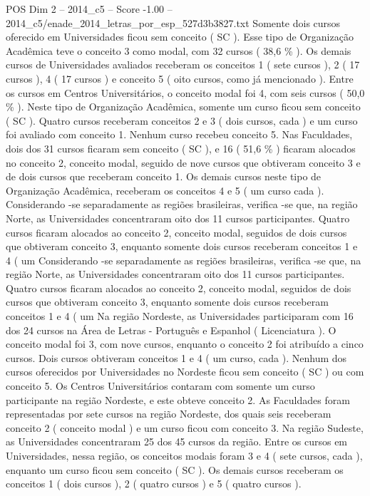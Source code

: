 \begin{textsample}{POS Dim 2 – 2014\_c5 – Score -1.00 – 2014\_c5/enade\_2014\_letras\_por\_esp\_527d3b3827.txt}
Somente dois cursos oferecido em Universidades ficou sem conceito ( SC ).
Esse tipo de Organização Acadêmica teve o conceito 3 como modal, com 32 cursos ( 38,6 \% ).
Os demais cursos de Universidades avaliados receberam os conceitos 1 ( sete cursos ), 2 ( 17 cursos ), 4 ( 17 cursos ) e conceito 5 ( oito cursos, como já mencionado ).
Entre os cursos em Centros Universitários, o conceito modal foi 4, com seis cursos ( 50,0 \% ).
Neste tipo de Organização Acadêmica, somente um curso ficou sem conceito ( SC ).
Quatro cursos receberam conceitos 2 e 3 ( dois cursos, cada ) e um curso foi avaliado com conceito 1.
Nenhum curso recebeu conceito 5.
Nas Faculdades, dois dos 31 cursos ficaram sem conceito ( SC ), e 16 ( 51,6 \% ) ficaram alocados no conceito 2, conceito modal, seguido de nove cursos que obtiveram conceito 3 e de dois cursos que receberam conceito 1.
Os demais cursos neste tipo de Organização Acadêmica, receberam os conceitos 4 e 5 ( um curso cada ).
Considerando -se separadamente as regiões brasileiras, verifica -se que, na região Norte, as Universidades concentraram oito dos 11 cursos participantes.
Quatro cursos ficaram alocados ao conceito 2, conceito modal, seguidos de dois cursos que obtiveram conceito 3, enquanto somente dois cursos receberam conceitos 1 e 4 ( um Considerando -se separadamente as regiões brasileiras, verifica -se que, na região Norte, as Universidades concentraram oito dos 11 cursos participantes.
Quatro cursos ficaram alocados ao conceito 2, conceito modal, seguidos de dois cursos que obtiveram conceito 3, enquanto somente dois cursos receberam conceitos 1 e 4 ( um Na região Nordeste, as Universidades participaram com 16 dos 24 cursos na Área de Letras - Português e Espanhol ( Licenciatura ).
O conceito modal foi 3, com nove cursos, enquanto o conceito 2 foi atribuído a cinco cursos.
Dois cursos obtiveram conceitos 1 e 4 ( um curso, cada ).
Nenhum dos cursos oferecidos por Universidades no Nordeste ficou sem conceito ( SC ) ou com conceito 5.
Os Centros Universitários contaram com somente um curso participante na região Nordeste, e este obteve conceito 2.
As Faculdades foram representadas por sete cursos na região Nordeste, dos quais seis receberam conceito 2 ( conceito modal ) e um curso ficou com conceito 3.
Na região Sudeste, as Universidades concentraram 25 dos 45 cursos da região.
Entre os cursos em Universidades, nessa região, os conceitos modais foram 3 e 4 ( sete cursos, cada ), enquanto um curso ficou sem conceito ( SC ).
Os demais cursos receberam os conceitos 1 ( dois cursos ), 2 ( quatro cursos ) e 5 ( quatro cursos ).

\end{textsample}
